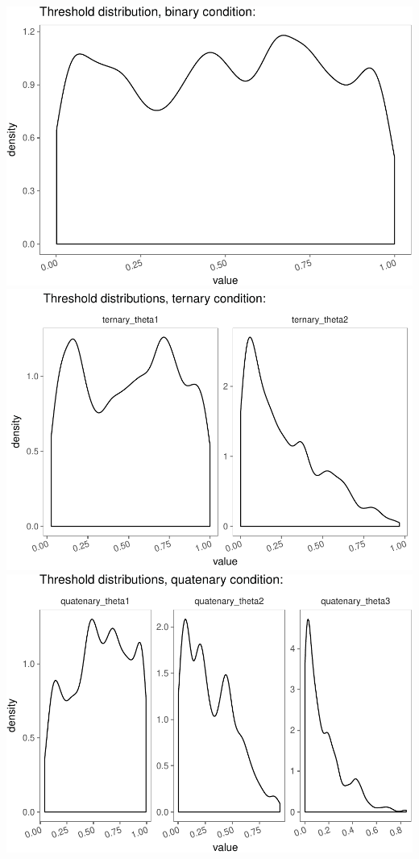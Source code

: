 \documentclass[floatsintext,man]{apa6}
\theoremstyle{definition}
\theoremstyle{definition}
\theoremstyle{definition}
\theoremstyle{remark}
\begin{document}
\includegraphics{writeup_files/figure-latex/unnamed-chunk-1-1.pdf}
\includegraphics{writeup_files/figure-latex/unnamed-chunk-1-2.pdf}
\includegraphics{writeup_files/figure-latex/unnamed-chunk-1-3.pdf}
\end{document}
